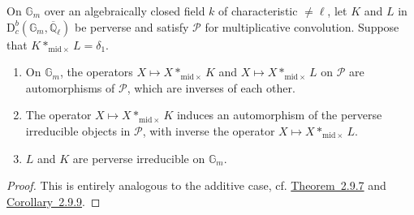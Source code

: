 On \(\mathbb{G}_m\) over an algebraically closed field \(k\) of characteristic
\(\ne\ell\), let \(K\) and \(L\) in
\(\mathrm{D}^b_c(\mathbb{G}_m,\overline{\mathbb{Q}}_\ell)\) be perverse and
satisfy \(\mathcal{P}\) for multiplicative convolution. Suppose that
\(K*_{\mathrm{mid}\times}L=\delta_1\).
\begin{enumerate}[label=(\arabic*)]
\item On \(\mathbb{G}_m\), the operators \(X\mapsto X*_{\mathrm{mid}\times}K\)
and \(X\mapsto X*_{\mathrm{mid}\times}L\) on \(\mathcal{P}\) are automorphisms
of \(\mathcal{P}\), which are inverses of each other.
\item The operator \(X\mapsto X*_{\mathrm{mid}\times}K\) induces an
automorphism of the perverse irreducible objects in \(\mathcal{P}\), with
inverse the operator \(X\mapsto X*_{\mathrm{mid}\times}L\).
\item \(L\) and \(K\) are perverse irreducible on \(\mathbb{G}_m\).
\end{enumerate}
\begin{proof}
This is entirely analogous to the additive case, cf.
\hyperref[thm:2.9.7]{Theorem~2.9.7} and
\hyperref[cor:2.9.9]{Corollary~2.9.9}.
\end{proof}

